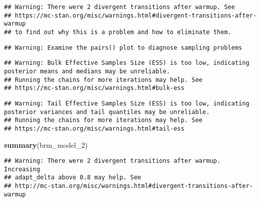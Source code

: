 \documentclass[
]{article}
\newenvironment{Shaded}{\begin{snugshade}}{\end{snugshade}}
\newcommand{\FunctionTok}[1]{\textcolor[rgb]{0.13,0.29,0.53}{\textbf{#1}}}
\newcommand{\NormalTok}[1]{#1}
\begin{document}
\begin{verbatim}
## Warning: There were 2 divergent transitions after warmup. See
## https://mc-stan.org/misc/warnings.html#divergent-transitions-after-warmup
## to find out why this is a problem and how to eliminate them.
\end{verbatim}

\begin{verbatim}
## Warning: Examine the pairs() plot to diagnose sampling problems
\end{verbatim}

\begin{verbatim}
## Warning: Bulk Effective Samples Size (ESS) is too low, indicating posterior means and medians may be unreliable.
## Running the chains for more iterations may help. See
## https://mc-stan.org/misc/warnings.html#bulk-ess
\end{verbatim}

\begin{verbatim}
## Warning: Tail Effective Samples Size (ESS) is too low, indicating posterior variances and tail quantiles may be unreliable.
## Running the chains for more iterations may help. See
## https://mc-stan.org/misc/warnings.html#tail-ess
\end{verbatim}

\begin{Shaded}
\begin{Highlighting}[]
\FunctionTok{summary}\NormalTok{(brm\_model\_2)}
\end{Highlighting}
\end{Shaded}

\begin{verbatim}
## Warning: There were 2 divergent transitions after warmup. Increasing
## adapt_delta above 0.8 may help. See
## http://mc-stan.org/misc/warnings.html#divergent-transitions-after-warmup
\end{verbatim}
\end{document}

